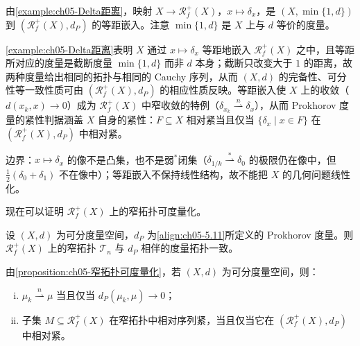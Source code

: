 \documentclass[../../main.tex]{subfiles}%
\begin{document}
\begin{remark}\label{remark:ch05-Delta等距}
由\cref{example:ch05-Delta距离}，映射 $X\to\mathscr{R}^+_f(X)$，$x\mapsto\delta_x$，是 $(X,\min\{1,d\})$ 到 $(\mathscr{R}^+_f(X),d_P)$ 的等距嵌入。注意 $\min\{1,d\}$ 是 $X$ 上与 $d$ 等价的度量。
\end{remark}

\begin{remark}\label{remark:ch05-Delta等距意义}
\cref{example:ch05-Delta距离}表明 $X$ 通过 $x\mapsto\delta_x$ 等距地嵌入 $\mathscr{R}^+_f(X)$ 之中，且等距所对应的度量是截断度量 $\min\{1,d\}$ 而非 $d$ 本身；截断只改变大于 $1$ 的距离，故两种度量给出相同的拓扑与相同的 Cauchy 序列，从而 $(X,d)$ 的完备性、可分性等一致性质可由 $(\mathscr{R}^+_f(X),d_P)$ 的相应性质反映。等距嵌入使 $X$ 上的收敛（$d(x_k,x)\to0$）成为 $\mathscr{R}^+_f(X)$ 中窄收敛的特例（$\delta_{x_k}\stackrel{n}{\rightharpoonup}\delta_x$），从而 Prokhorov 度量的紧性判据涵盖 $X$ 自身的紧性：$F\subseteq X$ 相对紧当且仅当 $\{\delta_x\mid x\in F\}$ 在 $(\mathscr{R}^+_f(X),d_P)$ 中相对紧。

边界：$x\mapsto\delta_x$ 的像不是凸集，也不是弱$^*$闭集（$\delta_{1/k}\stackrel{*}{\rightharpoonup}\delta_0$ 的极限仍在像中，但 $\frac12(\delta_0+\delta_1)$ 不在像中）；等距嵌入不保持线性结构，故不能把 $X$ 的几何问题线性化。
\end{remark}
现在可以证明 $\mathscr{R}^+_f(X)$ 上的窄拓扑可度量化。

\begin{proposition}\label{proposition:ch05-窄拓扑可度量化}
设 $(X,d)$ 为可分度量空间，$d_P$ 为\eqref{align:ch05-5.11}所定义的 Prokhorov 度量。则 $\mathscr{R}^+_f(X)$ 上的窄拓扑 $\mathcal{T}_n$ 与 $d_P$ 相伴的度量拓扑一致。
\end{proposition}

\begin{remark}\label{remark:ch05-Prokhorov推论}
由\cref{proposition:ch05-窄拓扑可度量化}，若 $(X,d)$ 为可分度量空间，则：
\begin{enumerate}[(i)]
\item\label{item:ch05-prok-i} $\mu_k\stackrel{n}{\rightharpoonup}\mu$ 当且仅当 $d_P(\mu_k,\mu)\to0$；
\item\label{item:ch05-prok-ii} 子集 $M\subseteq\mathscr{R}^+_f(X)$ 在窄拓扑中相对序列紧，当且仅当它在 $(\mathscr{R}^+_f(X),d_P)$ 中相对紧。
\end{enumerate}
\end{remark}
\end{document}
